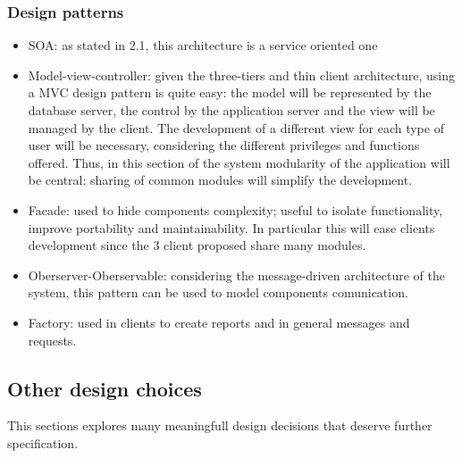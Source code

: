 \subsubsection{Design patterns}
\begin{itemize}
	\item SOA: as stated in 2.1, this architecture is a service oriented one
	\item Model-view-controller: given the three-tiers and thin client architecture, using a MVC design pattern is quite easy: the model will be represented by the database server, the control by the application server and the view will be managed by the client. \newline
	The development of a different view for each type of user will be necessary, considering the different privileges and functions offered. Thus, in this section of the system modularity of the application will be central: sharing of common modules will simplify the development. 
	\item Facade: used to hide components complexity; useful to isolate functionality, improve portability and maintainability. In particular this will ease clients development since the 3 client proposed share many modules.
	\item Oberserver-Oberservable: considering the message-driven architecture of the system, this pattern can be used to model components comunication.
	\item Factory: used in clients to create reports and in general messages and requests.
\end{itemize}

\subsection{Other design choices}
This sections explores many meaningfull design decisions that deserve further specification.

